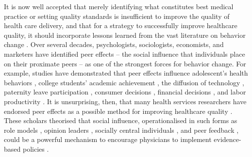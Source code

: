 \documentclass[12pt]{article}
\begin{document}
It is now well accepted that merely identifying what constitutes best medical practice or setting quality standards is insufficient to improve the quality of health care delivery, and that for a strategy to successfully improve healthcare quality, it should incorporate lessons learned from the vast literature on behavior change \citep{rubensteinUnderstandingHealthCare2000,mittmanImplementingClinicalPractice1992}. Over several decades, psychologists, sociologists, economists, and marketers have identified peer effects -- the social influence that individuals place on their proximate peers -- as one of the strongest forces for behavior change. For example, studies have demonstrated that peer effects influence adolescent's health behaviors \citep{gaviriaSchoolBasedPeerEffects2001,lundborgHavingWrongFriends2006,aliEstimatingPeerEffects2011}, college students' academic achievement \citep{sacerdotePeerEffectsRandom2001}, the diffusion of technology \citep{bollingerPeerEffectsDiffusion2012}, paternity leave participation \citep{dahlPeerEffectsProgram2014}, consumer decisions \citep{morettiSocialLearningPeer2011}, financial decisions \citep{bursztynUnderstandingMechanismsUnderlying2014}, and labor productivity \citep{herbstPeerEffectsWorker2015}.
It is unsurprising, then, that many health services researchers have endorsed peer effects as a possible method for improving healthcare quality \citep{goodpastorMotivatingPhysicianBehaviour1996}. These scholars theorised that social influence, operationalised in such forms as role models \citep{kennyRoleModelingPhysicians2003}, opinion leaders \citep{locockUnderstandingRoleOpinion2001}, socially central individuals \citep{meltzerExploringUseSocial2010}, and peer feedback \citep{pronovostImprovingHealthcareQuality2012}, could be a powerful mechanism to encourage physicians to implement evidence-based policies \citep{phelpsVariationsMedicalPractice1993}.
\end{document}
